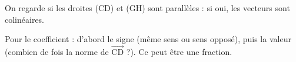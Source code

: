 \documentclass[border=4pt]{standalone}
\newcommand{\V}[1]{\overrightarrow{\mathrm{#1}}}
\begin{document}
\begin{minipage}{8.5cm}\large \colorbox{orange!8}{\begin{minipage}{8.2cm}\par On regarde si les droites (CD) et (GH) sont parallèles : si oui, les vecteurs sont colinéaires.\par Pour le coefficient : d'abord le signe (même sens ou sens opposé), puis la valeur (combien de fois la norme de $\V{CD}$ ?). Ce peut être une fraction.\vspace{4pt}\end{minipage}}\end{minipage}
\end{document}
